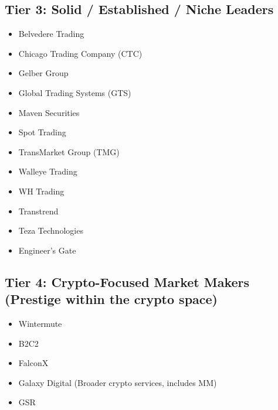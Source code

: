 \documentclass[11pt,a4paper]{article}
\begin{document}
\subsection*{Tier 3: Solid / Established / Niche Leaders}
\begin{multicols}{3}
\begin{itemize}[label=\textbullet, leftmargin=*, itemsep=1pt, parsep=0pt]
    \item Belvedere Trading
    \item Chicago Trading Company (CTC)
    \item Gelber Group
    \item Global Trading Systems (GTS)
    \item Maven Securities
    \item Spot Trading
    \item TransMarket Group (TMG)
    \item Walleye Trading
    \item WH Trading
    \item Transtrend
    \item Teza Technologies
    \item Engineer's Gate
\end{itemize}
\end{multicols}

\subsection*{Tier 4: Crypto-Focused Market Makers (Prestige within the crypto space)}
\begin{multicols}{3}
\begin{itemize}[label=\textbullet, leftmargin=*, itemsep=1pt, parsep=0pt]
    \item Wintermute
    \item B2C2
    \item FalconX
    \item Galaxy Digital (Broader crypto services, includes MM)
    \item GSR
\end{itemize}
\end{multicols}
\end{document}
